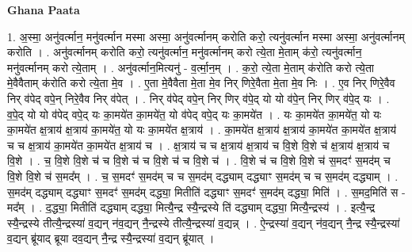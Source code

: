 \documentclass[17pt]{extarticle}
\begin{document}
\textbf{Ghana Paata } \newline

1. अ॒स्मा॒ अनु॑वर्त्मान॒ मनु॑वर्त्मान मस्मा अस्मा॒ अनु॑वर्त्मानम् करोति करो॒ त्यनु॑वर्त्मान मस्मा अस्मा॒ अनु॑वर्त्मानम् करोति । . अनु॑वर्त्मानम् करोति करो॒ त्यनु॑वर्त्मान॒ मनु॑वर्त्मानम् करो त्ये॒ता मे॒ताम् क॑रो॒ त्यनु॑वर्त्मान॒ मनु॑वर्त्मानम् करो त्ये॒ताम् । . अनु॑वर्त्मान॒मित्यनु॑ - व॒र्त्मा॒न॒म् । . क॒रो॒ त्ये॒ता मे॒ताम् क॑रोति करो त्ये॒ता मे॒वैवैताम् क॑रोति करो त्ये॒ता मे॒व । . ए॒ता मे॒वैवैता मे॒ता मे॒व निर् णिरे॒वैता मे॒ता मे॒व निः । . ए॒व निर् णिरे॒वैव निर् व॑पेद् वपे॒न् निरे॒वैव निर् व॑पेत् । . निर् व॑पेद् वपे॒न् निर् णिर् व॑पे॒द् यो यो व॑पे॒न् निर् णिर् व॑पे॒द् यः । . व॒पे॒द् यो यो व॑पेद् वपे॒द् यः का॒मये॑त का॒मये॑त॒ यो व॑पेद् वपे॒द् यः का॒मये॑त । . यः का॒मये॑त का॒मये॑त॒ यो यः का॒मये॑त क्ष॒त्राय॑ क्ष॒त्राय॑ का॒मये॑त॒ यो यः का॒मये॑त क्ष॒त्राय॑ । . का॒मये॑त क्ष॒त्राय॑ क्ष॒त्राय॑ का॒मये॑त का॒मये॑त क्ष॒त्राय॑ च च क्ष॒त्राय॑ का॒मये॑त का॒मये॑त क्ष॒त्राय॑ च । . क्ष॒त्राय॑ च च क्ष॒त्राय॑ क्ष॒त्राय॑ च वि॒शे वि॒शे च॑ क्ष॒त्राय॑ क्ष॒त्राय॑ च वि॒शे । . च॒ वि॒शे वि॒शे च॑ च वि॒शे च॑ च वि॒शे च॑ च वि॒शे च॑ । . वि॒शे च॑ च वि॒शे वि॒शे च॑ स॒मदꣳ॑ स॒मद॑म् च वि॒शे वि॒शे च॑ स॒मद᳚म् । . च॒ स॒मदꣳ॑ स॒मद॑म् च च स॒मद॑म् दद्ध्याम् दद्ध्याꣳ स॒मद॑म् च च स॒मद॑म् दद्ध्याम् । . स॒मद॑म् दद्ध्याम् दद्ध्याꣳ स॒मदꣳ॑ स॒मद॑म् दद्ध्या॒ मितीति॑ दद्ध्याꣳ स॒मदꣳ॑ स॒मद॑म् दद्ध्या॒ मिति॑ । . स॒मद॒मिति॑ स - मद᳚म् । . द॒द्ध्या॒ मितीति॑ दद्ध्याम् दद्ध्या॒ मित्यै॒न्द्र स्यै॒न्द्रस्ये ति॑ दद्ध्याम् दद्ध्या॒ मित्यै॒न्द्रस्य॑ । . इत्यै॒न्द्र स्यै॒न्द्रस्ये तीत्यै॒न्द्रस्या॑ व॒द्यन् न॑व॒द्यन् नै॒न्द्रस्ये तीत्यै॒न्द्रस्या॑ व॒द्यन्न् । . ऐ॒न्द्रस्या॑ व॒द्यन् न॑व॒द्यन् नै॒न्द्र स्यै॒न्द्रस्या॑ व॒द्यन् ब्रू॑याद् ब्रूया दव॒द्यन् नै॒न्द्र स्यै॒न्द्रस्या॑ व॒द्यन् ब्रू॑यात् । \newline
\end{document}
